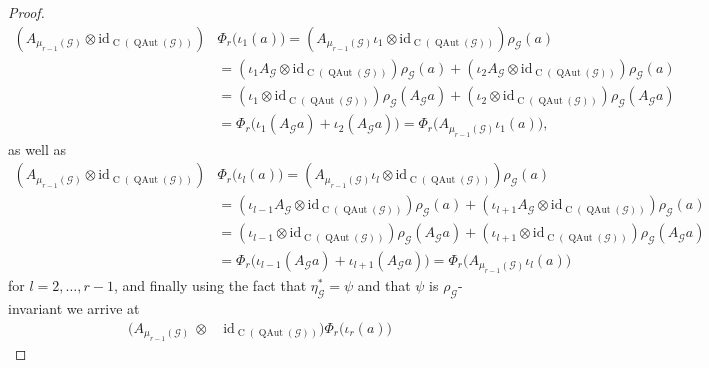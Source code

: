 \documentclass[11pt,reqno]{amsart}
\newcommand{\id}{\mathrm{id}}
\newcommand{\tens}{\otimes}
\DeclareMathOperator{\QAut}{QAut}
\DeclareMathOperator{\C}{C}
\begin{document}
\begin{proof}
\begin{align*}
(A_{\scriptscriptstyle\mu_{r-1}(\mathcal{G})}\tens\id_{\C(\QAut(\mathcal{G}))})
&\Phi_r\bigl(\iota_1(a)\bigr)
=(A_{\scriptscriptstyle\mu_{r-1}(\mathcal{G})}\iota_1\tens\id_{\C(\QAut(\mathcal{G}))})\rho_{\scriptscriptstyle\mathcal{G}}(a)\\
&=(\iota_1 A_{\scriptscriptstyle\mathcal{G}}\tens\id_{\C(\QAut(\mathcal{G}))})\rho_{\scriptscriptstyle\mathcal{G}}(a)
+(\iota_2 A_{\scriptscriptstyle\mathcal{G}}\tens\id_{\C(\QAut(\mathcal{G}))})\rho_{\scriptscriptstyle\mathcal{G}}(a)\\
&=(\iota_1\tens\id_{\C(\QAut(\mathcal{G}))})\rho_{\scriptscriptstyle\mathcal{G}}(A_{\scriptscriptstyle\mathcal{G}}a)
+(\iota_2\tens\id_{\C(\QAut(\mathcal{G}))})\rho_{\scriptscriptstyle\mathcal{G}}(A_{\scriptscriptstyle\mathcal{G}}a)\\
&=\Phi_r\bigl(\iota_1(A_{\scriptscriptstyle\mathcal{G}}a)+\iota_2(A_{\scriptscriptstyle\mathcal{G}}a)\bigr)
=\Phi_r\bigl(A_{\scriptscriptstyle\mu_{r-1}(\mathcal{G})}\iota_1(a)\bigr),
\end{align*}
as well as
\begin{align*}
(A_{\scriptscriptstyle\mu_{r-1}(\mathcal{G})}\tens\id_{\C(\QAut(\mathcal{G}))})
&\Phi_r\bigl(\iota_l(a)\bigr)
=(A_{\scriptscriptstyle\mu_{r-1}(\mathcal{G})}\iota_l\tens\id_{\C(\QAut(\mathcal{G}))})\rho_{\scriptscriptstyle\mathcal{G}}(a)\\
&=(\iota_{l-1}A_{\scriptscriptstyle\mathcal{G}}\tens\id_{\C(\QAut(\mathcal{G}))})\rho_{\scriptscriptstyle\mathcal{G}}(a)
+(\iota_{l+1}A_{\scriptscriptstyle\mathcal{G}}\tens\id_{\C(\QAut(\mathcal{G}))})\rho_{\scriptscriptstyle\mathcal{G}}(a)\\
&=(\iota_{l-1}\tens\id_{\C(\QAut(\mathcal{G}))})\rho_{\scriptscriptstyle\mathcal{G}}(A_{\scriptscriptstyle\mathcal{G}}a)
+(\iota_{l+1}\tens\id_{\C(\QAut(\mathcal{G}))})\rho_{\scriptscriptstyle\mathcal{G}}(A_{\scriptscriptstyle\mathcal{G}}a)\\
&=\Phi_r\bigl(\iota_{l-1}(A_{\scriptscriptstyle\mathcal{G}}a)+\iota_{l+1}(A_{\scriptscriptstyle\mathcal{G}}a)\bigr)
=\Phi_r\bigl(A_{\scriptscriptstyle\mu_{r-1}(\mathcal{G})}\iota_l(a)\bigr)
\end{align*}
for $l=2,\dotsc,r-1$, and finally using the fact that $\eta_{\scriptscriptstyle\mathcal{G}}^*=\psi$ and that $\psi$ is $\rho_{\scriptscriptstyle\mathcal{G}}$-invariant we arrive at
\begin{align*}
(A_{\scriptscriptstyle\mu_{r-1}(\mathcal{G})}\:\tens\:&\id_{\C(\QAut(\mathcal{G}))})
\Phi_r\bigl(\iota_r(a)\bigr)

\end{align*}
\end{proof}
\end{document}
